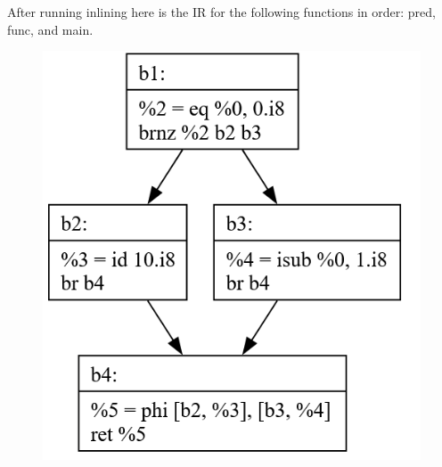 \documentclass[11pt, a4paper, titlepage]{article}
\begin{document}
After running inlining here is the IR for the following functions in order: pred, func, and main.

\begin{figure}[H]
  \centering
  \includegraphics[scale=0.3]{images/i42.png}

\end{figure}
\end{document}

